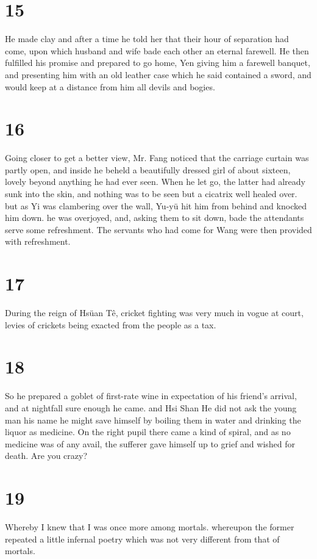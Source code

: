 \documentclass[11pt,a5paper]{book}
\begin{document}
\chapter*{\normalfont\Large 15}
He made clay and after a time he told her that their hour of separation had come, upon which husband and wife bade each other an eternal farewell. He then fulfilled his promise and prepared to go home, Yen giving him a farewell banquet, and presenting him with an old leather case which he said contained a sword, and would keep at a distance from him all devils and bogies.
\clearpage

\chapter*{\normalfont\Large 16}
Going closer to get a better view, Mr. Fang noticed that the carriage curtain was partly open, and inside he beheld a beautifully dressed girl of about sixteen, lovely beyond anything he had ever seen. When he let go, the latter had already sunk into the skin, and nothing was to be seen but a cicatrix well healed over. but as Yi was clambering over the wall, Yu-yü hit him from behind and knocked him down. he was overjoyed, and, asking them to sit down, bade the attendants serve some refreshment. The servants who had come for Wang were then provided with refreshment.
\clearpage

\chapter*{\normalfont\Large 17}
During the reign of Hsüan Tê, cricket fighting was very much in vogue at court, levies of crickets being exacted from the people as a tax.
\clearpage

\chapter*{\normalfont\Large 18}
So he prepared a goblet of first-rate wine in expectation of his friend’s arrival, and at nightfall sure enough he came. and Hsi Shan He did not ask the young man his name he might save himself by boiling them in water and drinking the liquor as medicine. On the right pupil there came a kind of spiral, and as no medicine was of any avail, the sufferer gave himself up to grief and wished for death. Are you crazy?
\clearpage

\chapter*{\normalfont\Large 19}
Whereby I knew that I was once more among mortals. whereupon the former repeated a little infernal poetry which was not very different from that of mortals.
\clearpage
\end{document}
